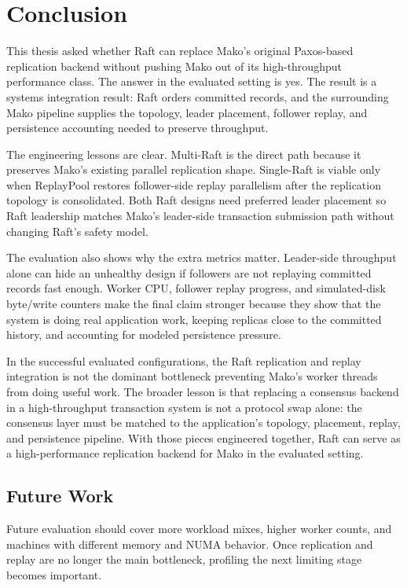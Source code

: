 \chapter{Conclusion}

This thesis asked whether Raft can replace Mako's original Paxos-based
replication backend without pushing Mako out of its high-throughput
performance class. The answer in the evaluated setting is yes. The result is a
systems integration result: Raft orders committed records, and the surrounding
Mako pipeline supplies the topology, leader placement, follower replay, and
persistence accounting needed to preserve throughput.

The engineering lessons are clear. Multi-Raft is the direct path because it
preserves Mako's existing parallel replication shape. Single-Raft is viable
only when ReplayPool restores follower-side replay parallelism after the
replication topology is consolidated. Both Raft designs need preferred leader
placement so Raft leadership matches Mako's leader-side transaction submission
path without changing Raft's safety model.

The evaluation also shows why the extra metrics matter. Leader-side throughput
alone can hide an unhealthy design if followers are not replaying committed
records fast enough. Worker CPU, follower replay progress, and simulated-disk
byte/write counters make the final claim stronger because they show that the
system is doing real application work, keeping replicas close to the committed
history, and accounting for modeled persistence pressure.

In the successful evaluated configurations, the Raft replication and replay
integration is not the dominant bottleneck preventing Mako's worker threads
from doing useful work. The broader lesson is that replacing a consensus
backend in a high-throughput transaction system is not a protocol swap alone:
the consensus layer must be matched to the application's topology, placement,
replay, and persistence pipeline. With those pieces engineered together, Raft
can serve as a high-performance replication backend for Mako in the evaluated
setting.

\section{Future Work}

Future evaluation should cover more workload mixes, higher worker counts, and
machines with different memory and NUMA behavior. Once replication and replay
are no longer the main bottleneck, profiling the next limiting stage becomes
important.

